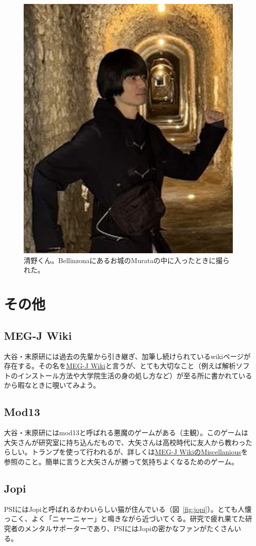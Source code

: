 \begin{figure}
  \vspace*{-\intextsep}
  \centering
  \includegraphics[width=0.3\columnwidth]{fig/takumi.png}
  \caption{清野くん。Bellinzonaにあるお城のMurataの中に入ったときに撮られた。}
  \label{fig:takumi}
\end{figure}

\section{その他}

\subsection{MEG-J Wiki}

大谷・末原研には過去の先輩から引き継ぎ、加筆し続けられているwikiページが存在する。その名を\href{http://meg.icepp.s.u-tokyo.ac.jp/restricted/dokuwiki/doku.php?id=start}{MEG-J Wiki}と言うが、とても大切なこと（例えば解析ソフトのインストール方法や大学院生活の身の処し方など）が至る所に書かれているから暇なときに覗いてみよう。

\subsection{Mod13}
\label{subsec:mod13}
大谷・末原研にはmod13と呼ばれる悪魔のゲームがある（主観）。このゲームは大矢さんが研究室に持ち込んだもので、大矢さんは高校時代に友人から教わったらしい。トランプを使って行われるが、詳しくは\href{http://meg.icepp.s.u-tokyo.ac.jp/restricted/dokuwiki/doku.php?id=start}{MEG-J WikiのMiscellanious}を参照のこと。簡単に言うと大矢さんが勝って気持ちよくなるためのゲーム。

\subsection{Jopi}

PSIにはJopiと呼ばれるかわいらしい猫が住んでいる（図~\ref{fig:jopi}）。とても人懐っこく、よく「ニャーニャー」と鳴きながら近づいてくる。研究で疲れ果てた研究者のメンタルサポーターであり、PSIにはJopiの密かなファンがたくさんいる。

